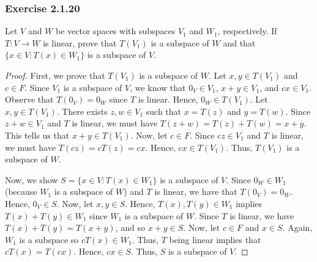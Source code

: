 \subsubsection{Exercise 2.1.20} Let \( V  \) and \( W \) be vector spaces with subspaces \( V_{1}  \) and \( W_{1}  \), respectively. If \( T:V \to W  \) is linear, prove that \( T(V_{1})  \) is a subspace of \( W  \) and that \( \{ x \in V : T(x) \in W_{1} \}   \) is a subspace of \( V  \).
\begin{proof}
    First, we prove that \( T(V_{1}) \) is a subspace of \( W  \). Let \( x,y \in T(V_{1}) \) and \( c \in F  \). Since \( V_{1}  \) is a subspace of \( V  \), we know that \( 0_{V} \in V_{1} \), \( x + y \in V_{1} \), and \( cx \in V_{1} \). Observe that \( T(0_{V}) = 0_{W} \) since \( T \) is linear. Hence, \( 0_{W} \in T(V_{1})\). Let \( x,y \in T(V_{1}) \). There exists \( z, w \in {V}_{1} \) such that \( x = T(z)  \) and \( y = T(w) \). Since \( z + w \in {V}_{1} \) and \( T  \) is linear, we must have \( T(z+w) = T(z) + T(w) = x + y. \) This tells us that \( x + y \in T({V}_{1}) \). Now, let \( c \in F  \). Since \( cz \in {V}_{1} \) and \( T  \) is linear, we must have \( T(cz) = cT(z) = cx \). Hence, \( cx \in T({V}_{1}) \). Thus, \( T({V}_{1}) \) is a subspace of \( W  \).

Now, we show \( S =  \{ x \in V : T(x) \in W_{1} \}  \) is a subspace of \( V  \). Since \( 0_{W} \in W_{1} \) (because \( W_{1}  \) is a subspace of \( W \)) and \( T \) is linear, we have that \( T(0_{V}) = 0_{W}. \) Hence, \( 0_{V} \in S  \). Now, let \( x,y \in S  \). Hence, \( T(x), T(y) \in W_{1} \) implies \( T(x) + T(y) \in W_{1} \) since \( W_{1} \) is a subspace of \( W \). Since \( T  \) is linear, we have \( T(x) + T(y) = T(x+y) \), and so \( x + y \in S \). Now, let \( c \in F  \) and \( x \in S  \). Again, \( W_{1} \) is a subspace so \( c T(x) \in W_{1} \). Thus, \( T \) being linear implies that \( cT(x) = T(cx)\). Hence, \( cx \in S  \). Thus, \( S  \) is a subspace of \( V  \).
\end{proof}

